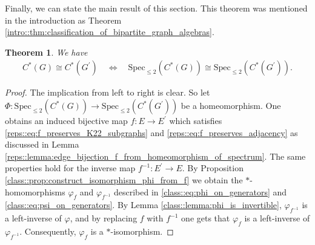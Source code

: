 \documentclass[a4paper]{amsart}
\newtheorem{thm}{Theorem}[section]
\begin{document}
Finally, we can state the main result of this section. This theorem was mentioned in the introduction as Theorem \ref{intro::thm:classification_of_bipartite_graph_algebras}.

\begin{thm}
    \label{class::thm:classification_of_bipartite_graph_algebras}
    We have 
    \begin{align*}
        C^\ast(G) \cong C^\ast(G^\prime) 
            \quad \Leftrightarrow \quad 
        \mathrm{Spec}_{\leq 2}(C^\ast(G)) \cong \mathrm{Spec}_{\leq 2}(C^\ast(G^\prime)).
    \end{align*}
\end{thm}

\begin{proof}
    The implication from left to right is clear. So let $\Phi: \mathrm{Spec}_{\leq 2}(C^\ast(G)) \to \mathrm{Spec}_{\leq 2}(C^\ast(G^\prime))$ be a homeomorphism. One obtains an induced bijective map $f: E \to E^\prime$ which satisfies \eqref{reps::eq:f_preserves_K22_subgraphs} and \eqref{reps::eq:f_preserves_adjacency} as discussed in Lemma \ref{reps::lemma:edge_bijection_f_from_homeomorphism_of_spectrum}. The same properties hold for the inverse map $f^{-1}: E^\prime \to E$. By Proposition \ref{class::prop:construct_isomorphism_phi_from_f} we obtain the $\ast$-homomorphisms $\varphi_f$ and $\varphi_{f^{-1}}$ described in \eqref{class::eq:phi_on_generators} and \eqref{class::eq:psi_on_generators}. By Lemma \ref{class::lemma:phi_is_invertible}, $\varphi_{f^{-1}}$ is a left-inverse of $\varphi$, and by replacing $f$ with $f^{-1}$ one gets that $\varphi_{f}$ is a left-inverse of $\varphi_{f^{-1}}$. Consequently, $\varphi_f$ is a $\ast$-isomorphism.
\end{proof}


\printbibliography
\end{document}
